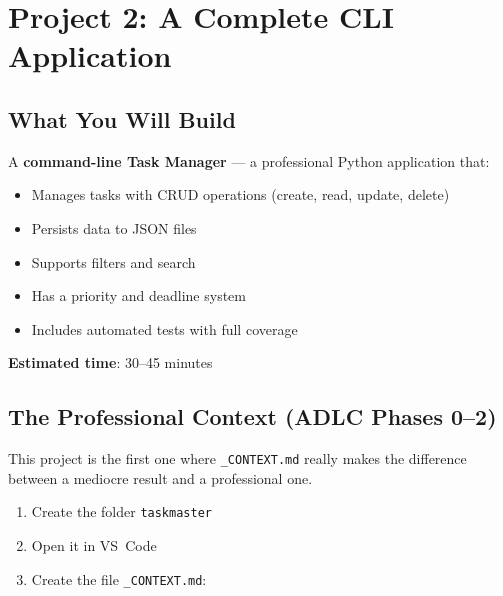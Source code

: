 \chapter{Project 2: A Complete CLI Application}

\section*{What You Will Build}
A \textbf{command-line Task Manager} --- a professional Python application that:
\begin{itemize}
  \item Manages tasks with CRUD operations (create, read, update, delete)
  \item Persists data to JSON files
  \item Supports filters and search
  \item Has a priority and deadline system
  \item Includes automated tests with full coverage
\end{itemize}

\textbf{Estimated time}: 30--45 minutes

\section{The Professional Context (ADLC Phases 0--2)}

This project is the first one where \texttt{\_CONTEXT.md} really makes the difference between a mediocre result and a professional one.

\begin{praticabox}[title={Hands-on --- Project setup}]
\begin{enumerate}
  \item Create the folder \texttt{taskmaster}
  \item Open it in VS~Code
  \item Create the file \texttt{\_CONTEXT.md}:
\end{enumerate}
\end{praticabox}

